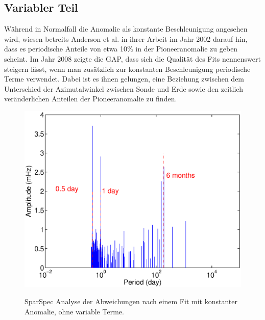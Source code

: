 
\subsection{Variabler Teil}
Während in Normalfall die Anomalie als konstante Beschleunigung angesehen wird, wiesen betreits Anderson et al. in
ihrer Arbeit im Jahr 2002 darauf hin, dass es periodische Anteile von etwa 10\% in der Pioneeranomalie zu
geben scheint.
Im Jahr 2008 zeigte die GAP, dass sich die Qualität des Fits nennenswert steigern lässt, wenn man zusätzlich zur konstanten Beschleunigung periodische Terme verwendet.
Dabei ist es ihnen gelungen, eine Beziehung zwischen dem Unterschied der Azimutalwinkel zwischen Sonde und Erde sowie
den zeitlich veränderlichen Anteilen der Pioneeranomalie zu finden. %

\begin{figure}[htnb]
\begin{minipage}[t]{.48\linewidth}
	\centering
	\includegraphics[width=\linewidth]{images/SparSpec_begining}
	\label{fig:SparSpec_pre}
  \caption{SparSpec Analyse der Abweichungen nach einem Fit mit konstanter Anomalie, ohne variable Terme.}
\end{minipage}
\hfill
\begin{minipage}[t]{.48\linewidth}
	\centering

\end{minipage}
\end{figure}
